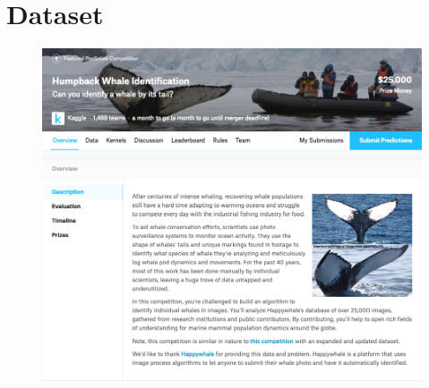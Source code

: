 \section{Dataset}
\begin{frame}[c]
    \begin{figure}
        \includegraphics[width=\linewidth]{Kaggle.png}
        \captionsetup{labelformat=empty}
        \caption{}
    \end{figure}
\end{frame}

